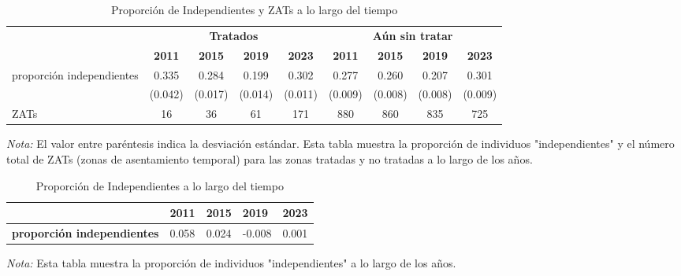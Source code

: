 \documentclass{article}
\begin{document}
\begin{table} [H]
  \centering
  \caption{Proporción de Independientes y ZATs a lo largo del tiempo}
  \label{tab:independientes_zats}
  \begin{adjustbox}{width=\textwidth,center} %
    \begin{tabular}{lcccccccc}
      \toprule
      & \multicolumn{4}{c}{\textbf{Tratados}} & \multicolumn{4}{c}{\textbf{Aún sin tratar}} \\
      \cmidrule(lr){2-5} \cmidrule(lr){6-9}
      & \textbf{2011} & \textbf{2015} & \textbf{2019} & \textbf{2023} & \textbf{2011} & \textbf{2015} & \textbf{2019} & \textbf{2023} \\
      \midrule
      proporción independientes & 0.335 & 0.284 & 0.199 & 0.302 & 0.277 & 0.260 & 0.207 & 0.301 \\
      & (0.042) & (0.017) & (0.014) & (0.011) & (0.009) & (0.008) & (0.008) & (0.009) \\
      \midrule
      ZATs & 16 & 36 & 61 & 171 & 880 & 860 & 835 & 725 \\
      \bottomrule
    \end{tabular}
  \end{adjustbox} %
  \parbox[t]{\textwidth}{%
    \vspace{0.5em}
    \small \textit{Nota:} El valor entre paréntesis indica la desviación estándar. Esta tabla muestra la proporción de individuos "independientes" y el número total de ZATs (zonas de asentamiento temporal) para las zonas tratadas y no tratadas a lo largo de los años.
  }
\end{table}

\begin{table} [H]
  \centering
  \caption{Proporción de Independientes a lo largo del tiempo}
  \label{tab:proporcion_independientes}
  \begin{tabular}{l *{4}{p{1.5cm}}} %
    \toprule
    & \textbf{2011} & \textbf{2015} & \textbf{2019} & \textbf{2023} \\
    \midrule
    \textbf{proporción independientes} & 0.058 & 0.024 & -0.008 & 0.001 \\
    \bottomrule
  \end{tabular}
  \parbox[t]{\textwidth}{%
    \vspace{0.5em}
    \small \textit{Nota:} Esta tabla muestra la proporción de individuos "independientes" a lo largo de los años.
  }
\end{table}
\end{document}
